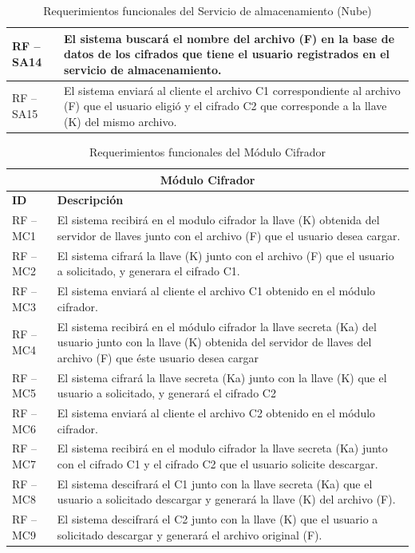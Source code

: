 \begin{table}[htb]
\begin{tabular}{| p{2cm} |  p{13.5cm} |}
RF – SA14 & El sistema buscará el nombre del archivo (F) en la base de datos de los cifrados que tiene el usuario registrados en el servicio de almacenamiento.\\ \hline
RF – SA15 & El sistema enviará al cliente el archivo C1 correspondiente al archivo (F) que el usuario eligió y el cifrado C2 que corresponde a la llave (K) del mismo archivo. \\ \hline
\end{tabular}
\caption{Requerimientos funcionales del Servicio de almacenamiento (Nube)}
\label{Servicio de almacenamiento (Nube) }
\end{table}


\begin{table}[htb]
\centering
\begin{tabular}{| p{2cm} |  p{13.5cm} |}
\hline
\multicolumn{2}{|c|}{\textbf{Módulo Cifrador}} \\ \hline
\textbf{ID} &  \textbf{Descripción} \\
\hline \hline
RF – MC1 & El sistema recibirá en el modulo cifrador la llave (K) obtenida del servidor de llaves junto con el archivo (F) que el usuario desea cargar. \\ \hline
RF – MC2 & El sistema cifrará la llave (K) junto con el archivo (F) que el usuario a solicitado, y generara el cifrado C1.\\ \hline
RF – MC3 & El sistema enviará al cliente el archivo C1 obtenido en el módulo cifrador. \\ \hline
RF – MC4 & El sistema recibirá en el módulo cifrador la llave secreta (Ka) del usuario junto con la llave (K) obtenida del servidor de llaves del archivo (F) que éste usuario desea cargar \\ \hline
RF – MC5 & El sistema cifrará  la llave secreta (Ka) junto con la llave (K) que el usuario a solicitado, y generará el cifrado C2 \\ \hline
RF – MC6 & El sistema enviará al cliente el archivo C2 obtenido en el módulo cifrador. \\ \hline
RF – MC7 & El sistema recibirá en el modulo cifrador la llave secreta (Ka) junto con el cifrado C1 y el cifrado C2 que el usuario solicite descargar.\\ \hline
RF – MC8 & El sistema descifrará el C1 junto con la llave secreta (Ka) que el usuario a solicitado descargar y generará la llave (K) del archivo (F).\\ \hline
RF – MC9 & El sistema descifrará el C2 junto con la llave (K) que el usuario a solicitado descargar y generará el archivo original (F).\\ \hline
\end{tabular}
\caption{Requerimientos funcionales del Módulo Cifrador}
\label{Módulo Cifrador}
\end{table}